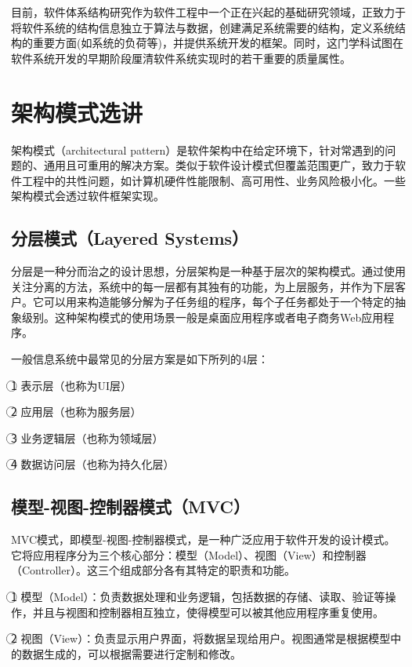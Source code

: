 \documentclass{SCIS2023cn}
\begin{document}
目前，软件体系结构研究作为软件工程中一个正在兴起的基础研究领域，正致力于将软件系统的结构信息独立于算法与数据，创建满足系统需要的结构，定义系统结构的重要方面(如系统的负荷等)，并提供系统开发的框架。同时，这门学科试图在软件系统开发的早期阶段厘清软件系统实现时的若干重要的质量属性。

\section{架构模式选讲}

架构模式（architectural pattern）是软件架构中在给定环境下，针对常遇到的问题的、通用且可重用的解决方案。类似于软件设计模式但覆盖范围更广，致力于软件工程中的共性问题，如计算机硬件性能限制、高可用性、业务风险极小化。一些架构模式会透过软件框架实现。

\subsection{分层模式（Layered Systems）}

分层是一种分而治之的设计思想，分层架构是一种基于层次的架构模式。通过使用关注分离的方法，系统中的每一层都有其独有的功能，为上层服务，并作为下层客户。它可以用来构造能够分解为子任务组的程序，每个子任务都处于一个特定的抽象级别。这种架构模式的使用场景一般是桌面应用程序或者电子商务Web应用程序。

一般信息系统中最常见的分层方案是如下所列的4层：

\textcircled{1} 表示层（也称为UI层）

\textcircled{2} 应用层（也称为服务层）

\textcircled{3} 业务逻辑层（也称为领域层）

\textcircled{4} 数据访问层（也称为持久化层）

\subsection{模型-视图-控制器模式（MVC）}

MVC模式，即模型-视图-控制器模式，是一种广泛应用于软件开发的设计模式。它将应用程序分为三个核心部分：模型（Model）、视图（View）和控制器（Controller）。这三个组成部分各有其特定的职责和功能。

\textcircled{1} 模型（Model）：负责数据处理和业务逻辑，包括数据的存储、读取、验证等操作，并且与视图和控制器相互独立，使得模型可以被其他应用程序重复使用。

\textcircled{2} 视图（View）：负责显示用户界面，将数据呈现给用户。视图通常是根据模型中的数据生成的，可以根据需要进行定制和修改。
\end{document}
